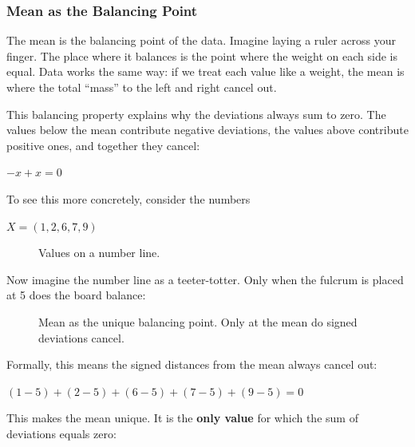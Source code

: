\documentclass[
  letterpaper,
  DIV=11,
  numbers=noendperiod]{scrreprt}
\begin{document}
\subsubsection{Mean as the Balancing
Point}\label{mean-as-the-balancing-point}

The mean is the balancing point of the data. Imagine laying a ruler
across your finger. The place where it balances is the point where the
weight on each side is equal. Data works the same way: if we treat each
value like a weight, the mean is where the total ``mass'' to the left
and right cancel out.

This balancing property explains why the deviations always sum to zero.
The values below the mean contribute negative deviations, the values
above contribute positive ones, and together they cancel:

\(-x + x = 0\)

To see this more concretely, consider the numbers

\(X = (1,2,6,7,9)\)

\begin{figure}


\caption{\label{fig-number-line}Values on a number line.}

\end{figure}%

Now imagine the number line as a teeter-totter. Only when the fulcrum is
placed at 5 does the board balance:

\begin{figure}


\caption{\label{fig-mean-balance-panels}Mean as the unique balancing
point. Only at the mean do signed deviations cancel.}

\end{figure}%

Formally, this means the signed distances from the mean always cancel
out:

\((1−5)+(2−5)+(6−5)+(7−5)+(9−5)=0\)

This makes the mean unique. It is the \textbf{only value} for which the
sum of deviations equals zero:
\end{document}

